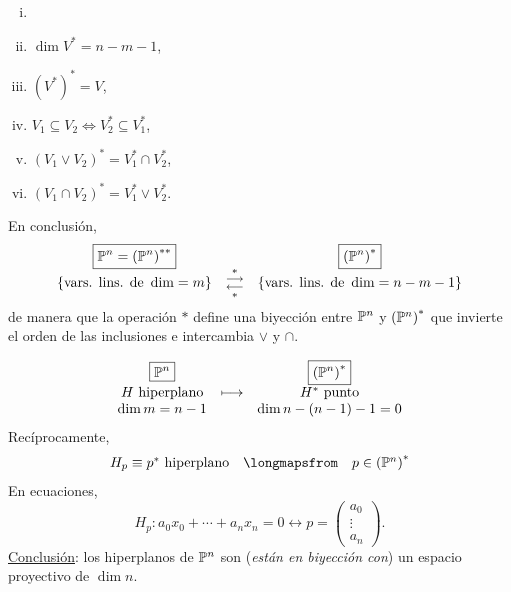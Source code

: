 \begin{obs}
    \begin{enumerate}[(i)]
        \item []
        \item $\dim V^* = n-m-1$,
        \item $\left(V^*\right)^*=V$,
        \item $V_1 \subseteq V_2 \iff V_2^* \subseteq V_1^*$,
        \item $\left(V_1 \vee V_2 \right)^* = V_1^* \cap V_2^*$,
        \item $\left(V_1 \cap V_2 \right) ^*=V_1^* \vee V_2^*$.
    \end{enumerate}
    \vspace{0,3cm}
    \noindent En conclusión,
    \[
        \begin{array}{ccc}
             \boxed{\mathbb{P}^n = \left(\mathbb{P}^n\right)^{**}} & & \boxed{\left( \mathbb{P}^n \right)^*}\\
             \left\{\text{vars. lins. de }\dim = m \right\} & \substack{* \\ \longrightarrow \\  \longleftarrow \\ *} & \left\{\text{vars. lins. de }\dim = n-m-1 \right\}
        \end{array}
    \]
    de manera que la operación $*$ define una biyección entre $\mathbb{P}^n$ y $\left( \mathbb{P}^n \right)^*$ que invierte el orden de las inclusiones e intercambia $\vee$ y $\cap$.
\end{obs}
\begin{obs}
    \[
        \begin{array}{ccc}
             \boxed{\mathbb{P}^n} & & \boxed{\left( \mathbb{P}^n \right)^*}\\
             H \text{ hiperplano} & \longmapsto & H^* \text{ punto}\\
             \dim m=n-1 & & \dim n-(n-1)-1=0
        \end{array}
    \]
    Recíprocamente,
    \[
        \begin{array}{ccc}
            H_p \equiv p^* \text{ hiperplano} & \longmapsfrom & p\in \left(\Po^n\right) ^*
        \end{array}
    \]
    En ecuaciones,
    \[
        H_p \colon a_0x_0+\cdots+a_nx_n=0 \longleftrightarrow p=\begin{pmatrix} a_0 \\ \vdots \\ a_n \end{pmatrix}.
    \]
    \underline{Conclusión}: los hiperplanos de $\mathbb{P}^n$ son (\textit{están en biyección con}) un espacio proyectivo de $\dim n$.
\end{obs}

